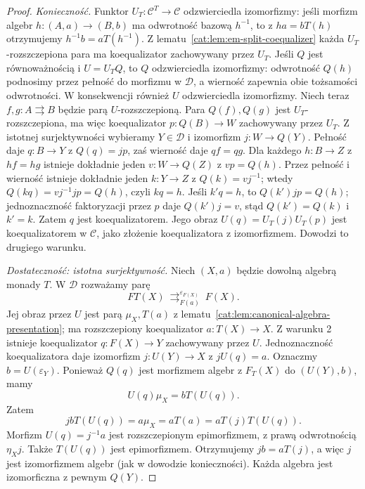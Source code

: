 \begin{proof}
\emph{Konieczność.} Funktor $U_T:\mathcal C^T\to\mathcal C$ odzwierciedla izomorfizmy: jeśli morfizm algebr $h:(A,a)\to(B,b)$ ma odwrotność bazową $h^{-1}$, to z $ha=bT(h)$ otrzymujemy $h^{-1}b=aT(h^{-1})$. Z lematu~\ref{cat:lem:em-split-coequalizer} każda $U_T$-rozszczepiona para ma koequalizator zachowywany przez $U_T$. Jeśli $Q$ jest równoważnością i $U=U_TQ$, to $Q$ odzwierciedla izomorfizmy: odwrotność $Q(h)$ podnosimy przez pełność do morfizmu w $\mathcal D$, a wierność zapewnia obie tożsamości odwrotności. W konsekwencji również $U$ odzwierciedla izomorfizmy.
Niech teraz $f,g:A\rightrightarrows B$ będzie parą $U$-rozszczepioną. Para $Q(f),Q(g)$ jest $U_T$-rozszczepiona, ma więc koequalizator $p:Q(B)\to W$ zachowywany przez $U_T$. Z istotnej surjektywności wybieramy $Y\in\mathcal D$ i izomorfizm $j:W\to Q(Y)$. Pełność daje $q:B\to Y$ z $Q(q)=jp$, zaś wierność daje $qf=qg$. Dla każdego $h:B\to Z$ z $hf=hg$ istnieje dokładnie jeden $v:W\to Q(Z)$ z $vp=Q(h)$. Przez pełność i wierność istnieje dokładnie jeden $k:Y\to Z$ z $Q(k)=vj^{-1}$; wtedy $Q(kq)=vj^{-1}jp=Q(h)$, czyli $kq=h$. Jeśli $k'q=h$, to $Q(k')jp=Q(h)$; jednoznaczność faktoryzacji przez $p$ daje $Q(k')j=v$, stąd $Q(k')=Q(k)$ i $k'=k$. Zatem $q$ jest koequalizatorem. Jego obraz $U(q)=U_T(j)U_T(p)$ jest koequalizatorem w $\mathcal C$, jako złożenie koequalizatora z izomorfizmem. Dowodzi to drugiego warunku.

\emph{Dostateczność: istotna surjektywność.}
Niech $(X,a)$ będzie dowolną algebrą monady $T$. W $\mathcal D$ rozważamy parę
\[
 FT(X)\ \mathop{\rightrightarrows}^{\varepsilon_{F(X)}}_{F(a)}\ F(X).
\]
Jej obraz przez $U$ jest parą $\mu_X,T(a)$ z lematu~\ref{cat:lem:canonical-algebra-presentation}; ma rozszczepiony koequalizator $a:T(X)\to X$. Z warunku 2 istnieje koequalizator $q:F(X)\to Y$ zachowywany przez $U$. Jednoznaczność koequalizatora daje izomorfizm $j:U(Y)\to X$ z $jU(q)=a$. Oznaczmy $b=U(\varepsilon_Y)$. Ponieważ $Q(q)$ jest morfizmem algebr z $F_T(X)$ do $(U(Y),b)$, mamy
\[
 U(q)\mu_X=bT(U(q)).
\]
Zatem
\[
 jbT(U(q))=a\mu_X=aT(a)=aT(j)T(U(q)).
\]
Morfizm $U(q)=j^{-1}a$ jest rozszczepionym epimorfizmem, z prawą odwrotnością $\eta_Xj$. Także $T(U(q))$ jest epimorfizmem. Otrzymujemy $jb=aT(j)$, a więc $j$ jest izomorfizmem algebr (jak w dowodzie konieczności). Każda algebra jest izomorficzna z pewnym $Q(Y)$.


\end{proof}
